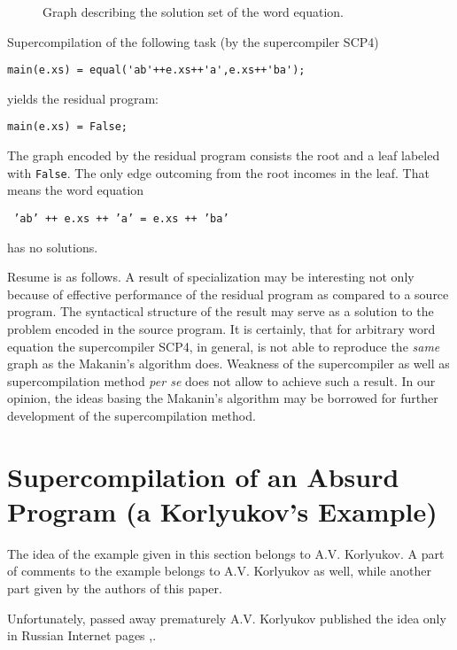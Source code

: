 \documentclass[preprint]{sigplanconf}
\begin{document}
\begin{figure}
\centerline{}
\caption{Graph describing the solution set of the word equation.}
\label{fig:graph}
\end{figure}



Supercompilation of the following task (by the supercompiler SCP4)
\begin{verbatim}
main(e.xs) = equal('ab'++e.xs++'a',e.xs++'ba');
\end{verbatim}
yields the residual program: 

\noindent
\begin{verbatim}
main(e.xs) = False;
\end{verbatim}

The graph encoded by the residual program consists 
the root and a leaf labeled with \texttt{False}. The only edge outcoming from the root incomes in the leaf. That means the word equation
\begin{center}
\texttt{
\texttt{'ab' ++ e.xs ++ 'a' = e.xs ++ 'ba'}
}
\end{center}
has no solutions.

Resume is as follows. A result of specialization may be interesting not only because of effective performance of the residual  
program as compared  to a source program. The syntactical structure of the result may serve as a solution to the problem encoded in the source program.  
It is certainly,  that for arbitrary word equation  the supercompiler SCP4, in general,  is not able to reproduce the \emph{same} graph as the Makanin's algorithm does. Weakness of the supercompiler as well as supercompilation method \emph{per se} does not allow to achieve such a result.  
In our opinion, the ideas basing the Makanin's algorithm may be borrowed for further development of the supercompilation method. 


\section{Supercompilation of an Absurd Program (a Korlyukov's Example)}\label{KorlyukovExample}


The idea of the example given in this section belongs to A.V. Korlyukov. A part of comments to the example belongs to A.V. Korlyukov as well, while another part given by the authors of this paper. 

Unfortunately, passed away prematurely A.V. Korlyukov published the idea only in Russian Internet pages \cite{Korlyukov:Missioners},\cite{Korlyukov:UserManual}.  
\end{document}
